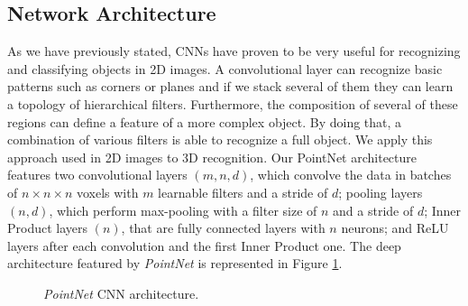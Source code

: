 \subsection{Network Architecture}
\label{cha:objrecog:sec:pointnet:subsec:network}

As we have previously stated, \acp{CNN} have proven to be very useful for recognizing and classifying objects in \ac{2D} images. A convolutional layer can recognize basic patterns such as corners or planes and if we stack several of them they can learn a topology of hierarchical filters. Furthermore, the composition of several of these regions can define a feature of a more complex object. By doing that, a combination of various filters is able to recognize a full object. We apply this approach used in \ac{2D} images to \ac{3D} recognition. Our PointNet architecture features two convolutional layers $(m, n, d)$, which convolve the data in batches of $n\times n\times n$ voxels with $m$ learnable filters and a stride of $d$; pooling layers $(n, d)$, which perform max-pooling with a filter size of $n$ and a stride of $d$; Inner Product layers $(n)$, that are fully connected layers with $n$ neurons; and \ac{ReLU} layers after each convolution and the first Inner Product one. The deep architecture featured by \emph{PointNet} is represented in Figure \ref{fig:objrecog:pointnetarch}.

\begin{figure}[!b]
    \caption{\emph{PointNet} \acl{CNN} architecture.}
    \label{fig:objrecog:pointnetarch}
\end{figure}

